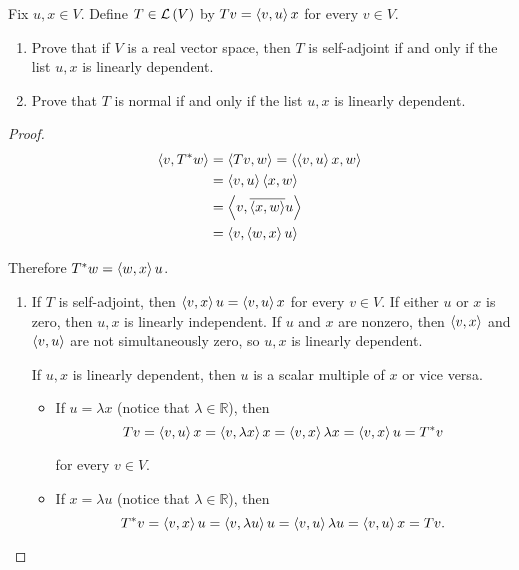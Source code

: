 \begin{exercise}
    Fix $u, x\in V$. Define $T\in \mathcal{L}\left({V}\right)$ by $Tv = \left\langle{v, u}\right\rangle x$ for every $v\in V$.
    \begin{enumerate}[label={(\alph*)}]
        \item Prove that if $V$ is a real vector space, then $T$ is self-adjoint if and only if the list $u, x$ is linearly dependent.
        \item Prove that $T$ is normal if and only if the list $u, x$ is linearly dependent.
    \end{enumerate}
\end{exercise}

\begin{proof}
    \begin{align*}
        \left\langle{v, T^{*}w}\right\rangle & = \left\langle{Tv, w}\right\rangle = \left\langle{\left\langle{v, u}\right\rangle x, w}\right\rangle \\
                              & = \left\langle{v, u}\right\rangle\left\langle{x, w}\right\rangle                     \\
                              & = \left\langle{v, \overline{\left\langle{x, w}\right\rangle}u}\right\rangle              \\
                              & = \left\langle{v, \left\langle{w, x}\right\rangle u}\right\rangle
    \end{align*}

    Therefore $T^{*}w = \left\langle{w, x}\right\rangle u$.
    \begin{enumerate}[label={(\alph*)}]
        \item If $T$ is self-adjoint, then $\left\langle{v, x}\right\rangle u = \left\langle{v, u}\right\rangle x$ for every $v\in V$. If either $u$ or $x$ is zero, then $u, x$ is linearly independent. If $u$ and $x$ are nonzero, then $\left\langle{v, x}\right\rangle$ and $\left\langle{v, u}\right\rangle$ are not simultaneously zero, so $u, x$ is linearly dependent.

              If $u, x$ is linearly dependent, then $u$ is a scalar multiple of $x$ or vice versa.
              \begin{itemize}
                  \item If $u = \lambda x$ (notice that $\lambda\in\mathbb{R}$), then
                        \[
                            Tv = \left\langle{v, u}\right\rangle x = \left\langle{v, \lambda x}\right\rangle x = \left\langle{v, x}\right\rangle\lambda x = \left\langle{v, x}\right\rangle u = T^{*}v
                        \]

                        for every $v\in V$.
                  \item If $x = \lambda u$ (notice that $\lambda\in\mathbb{R}$), then
                        \[
                            T^{*}v = \left\langle{v, x}\right\rangle u = \left\langle{v, \lambda u}\right\rangle u = \left\langle{v, u}\right\rangle\lambda u = \left\langle{v, u}\right\rangle x = Tv.
                        \]
              \end{itemize}


\end{enumerate}
\end{proof}
